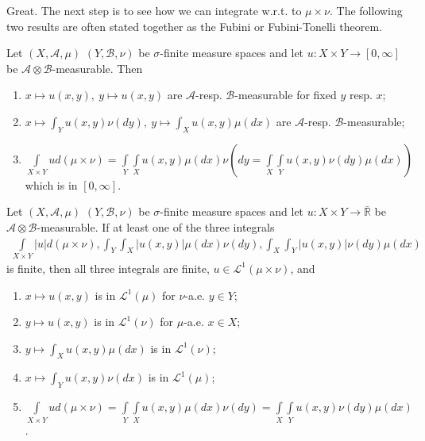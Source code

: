 Great. The next step is to see how we can integrate w.r.t. to \(\mu\times\nu\). The following two results are often stated together as the Fubini or Fubini-Tonelli theorem. 

\begin{theorem}[Tonelli]    \label{theorem:Tonelli}
    Let \((X,\mathscr{A},\mu)\) \((Y,\mathscr{B},\nu)\) be \(\sigma\)-finite measure spaces and let \(u:X\times Y\rightarrow[0,\infty]\) be \(\mathscr{A}\otimes\mathscr{B}\)-measurable. Then
    \begin{enumerate}[label=(\roman*)]
        \item \(x\mapsto u(x,y), \ y\mapsto u(x,y)\) are \(\mathscr{A}\)-resp. \(\mathscr{B}\)-measurable for fixed \(y\) resp. \(x\);
        \item \(x\mapsto \int_Y u(x,y)\nu(dy), \ y\mapsto\int_X u(x,y) \mu(dx)\) are \(\mathscr{A}\)-resp. \(\mathscr{B}\)-measurable;
        \item \(\int\limits_{X\times Y}ud(\mu\times \nu) = \int\limits_Y\int\limits_X u(x,y)\mu(dx)\nu(dy = \int\limits_X\int\limits_Yu(x,y)\nu(dy)\mu(dx))\) which is in \([0,\infty]\).
    \end{enumerate}
\end{theorem}
\begin{corollary} \label{corollary:fubini_theorem}
    Let \((X,\mathscr{A},\mu)\) \((Y,\mathscr{B},\nu)\) be \(\sigma\)-finite measure spaces and let \(u:X\times Y\rightarrow\bar{\mathbb{R}}\) be \(\mathscr{A}\otimes\mathscr{B}\)-measurable. If at least one of the three integrals
    \begin{align*}
        \int\limits_{X\times Y}|u|d(\mu\times\nu), \int_Y\int_X |u(x,y)|\mu(dx)\nu(dy), \int_X\int_Y |u(x,y)|\nu(dy)\mu(dx)
    \end{align*}
    is finite, then all three integrals are finite, \(u\in\mathcal{L}^1(\mu\times\nu)\), and
    \begin{enumerate}[label=(\roman*)]
        \item \(x\mapsto u(x,y)\) is in \(\mathcal{L}^1(\mu)\) for \(\nu\)-a.e. \(y\in Y\);
        \item \(y\mapsto u(x,y)\) is in \(\mathcal{L}^1(\nu)\) for \(\mu\)-a.e. \(x\in X\);
        \item \(y\mapsto\int_Xu(x,y)\mu(dx)\) is in \(\mathcal{L}^1(\nu)\);
        \item \(x\mapsto\int_Yu(x,y)\nu(dx)\) is in \(\mathcal{L}^1(\mu)\);
        \item \(\int\limits_{X\times Y}ud(\mu\times\nu)=\int\limits_Y\int\limits_X u(x,y)\mu(dx)\nu(dy)=\int\limits_X\int\limits_Y u(x,y)\nu(dy)\mu(dx)\).
    \end{enumerate}
\end{corollary}